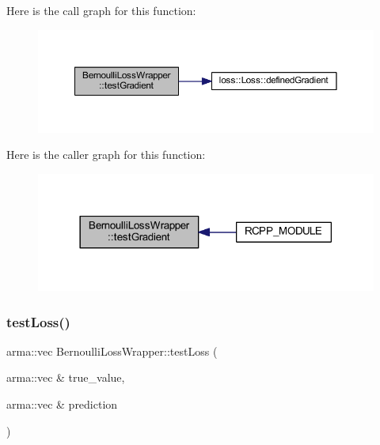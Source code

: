 Here is the call graph for this function\+:\nopagebreak
\begin{figure}[H]
\begin{center}
\leavevmode
\includegraphics[width=350pt]{class_bernoulli_loss_wrapper_a1b38529b66b4ec5ea6028d715719c20f_cgraph}
\end{center}
\end{figure}
Here is the caller graph for this function\+:\nopagebreak
\begin{figure}[H]
\begin{center}
\leavevmode
\includegraphics[width=318pt]{class_bernoulli_loss_wrapper_a1b38529b66b4ec5ea6028d715719c20f_icgraph}
\end{center}
\end{figure}
\mbox{\label{class_bernoulli_loss_wrapper_a9d3294f43955415ea0a3d80b941a8b2a}} 
\subsubsection{\texorpdfstring{test\+Loss()}{testLoss()}}
{\footnotesize\ttfamily arma\+::vec Bernoulli\+Loss\+Wrapper\+::test\+Loss (\begin{DoxyParamCaption}\item[{arma\+::vec \&}]{true\+\_\+value,  }\item[{arma\+::vec \&}]{prediction }\end{DoxyParamCaption})\hspace{0.3cm}{\ttfamily [inline]}}

